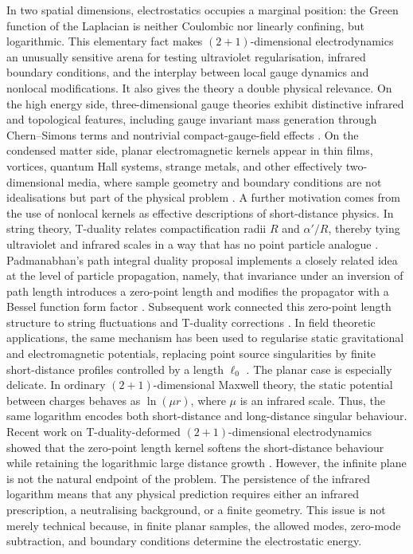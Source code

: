 \documentclass[openacc]{rsproca_new}%
\begin{document}
In two spatial dimensions, electrostatics occupies a marginal position: the Green function of the Laplacian is neither Coulombic nor linearly confining, but logarithmic. This elementary fact makes $(2+1)$-dimensional electrodynamics an unusually sensitive arena for testing ultraviolet regularisation, infrared boundary conditions, and the interplay between local gauge dynamics and nonlocal modifications. It also gives the theory a double physical relevance. On the high energy side, three-dimensional gauge theories exhibit distinctive infrared and topological features, including gauge invariant mass generation through Chern–Simons terms and nontrivial compact-gauge-field effects \cite{DeserJackiwTempleton1982, Polyakov1975}. On the condensed matter side, planar electromagnetic kernels appear in thin films, vortices, quantum Hall systems, strange metals, and other effectively two-dimensional media, where sample geometry and boundary conditions are not idealisations but part of the physical problem \cite{Pearl1964, KosterlitzThouless1973, LaNaveLimtragoolPhillips2019}. A further motivation comes from the use of nonlocal kernels as effective descriptions of short-distance physics. In string theory, T-duality relates compactification radii $R$ and $\alpha'/R$, thereby tying ultraviolet and infrared scales in a way that has no point particle analogue \cite{Sathiapalan1987, GiveonPorratiRabinovici1994}. Padmanabhan’s path integral duality proposal implements a closely related idea at the level of particle propagation, namely, that invariance under an inversion of path length introduces a zero-point length and modifies the propagator with a Bessel function form factor \cite{Padmanabhan1997}. Subsequent work connected this zero-point length structure to string fluctuations and T-duality corrections \cite{SmailagicSpallucciPadmanabhan2003, FontaniniSpallucciPadmanabhan2006}. In field theoretic applications, the same mechanism has been used to regularise static gravitational and electromagnetic potentials, replacing point source singularities by finite short-distance profiles controlled by a length $\ell_0$ \cite{NicoliniSpallucciWondrak2019, GaeteNicolini2022}. The planar case is especially delicate. In ordinary $(2+1)$-dimensional Maxwell theory, the static potential between charges behaves as $\ln{(\mu r)}$, where $\mu$ is an infrared scale. Thus, the same logarithm encodes both short-distance and long-distance singular behaviour. Recent work on T-duality-deformed $(2+1)$-dimensional electrodynamics showed that the zero-point length kernel softens the short-distance behaviour while retaining the logarithmic large distance growth \cite{GaeteNicolini2026}. However, the infinite plane is not the natural endpoint of the problem. The persistence of the infrared logarithm means that any physical prediction requires either an infrared prescription, a neutralising background, or a finite geometry. This issue is not merely technical because, in finite planar samples, the allowed modes, zero-mode subtraction, and boundary conditions determine the electrostatic energy.
\end{document}
